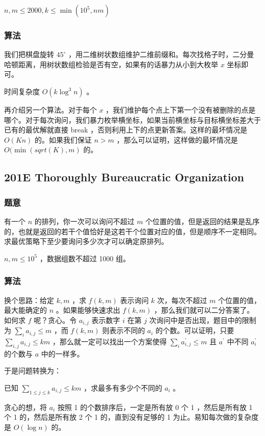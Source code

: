 \documentclass[11pt]{article}
\begin{document}
    $n, m \leq 2000, k \leq \min(10^5, nm)$
\subsubsection{算法}
\label{sec-11-5-2}

我们把棋盘旋转 $45^\circ$ ，用二维树状数组维护二维前缀和。每次找格子时，二分曼哈顿距离，用树状数组检验是否有空，如果有的话暴力从小到大枚举 $x$ 坐标即可。

时间复杂度 $O(k \log^3 n)$ 。

再介绍另一个算法。对于每个 $x$ ，我们维护每个点上下第一个没有被删除的点是哪个。对于每次询问，我们暴力枚举横坐标，如果当前横坐标与目标横坐标差大于已有的最优解就直接 break ，否则利用上下的点更新答案。这样的最坏情况是 $O(Kn)$ 的。如果我们保证 $n > m$ ，那么可以证明，这样做的最坏情况是 $O(\min(sqrt(K), m)$ 的。
\subsection{201E  Thoroughly Bureaucratic Organization}
\label{sec-11-6}
\subsubsection{题意}
\label{sec-11-6-1}

    有一个 $n$ 的排列，你一次可以询问不超过 $m$ 个位置的值，但是返回的结果是乱序的，也就是返回的若干个值恰好是这若干个位置对应的值，但是顺序不一定相同。求最优策略下至少要询问多少次才可以确定原排列。

    $n, m \leq 10^5$ ，数据组数不超过 1000 组。
\subsubsection{算法}
\label{sec-11-6-2}

    换个思路：给定 $k, m$ ，求 $f(k, m)$ 表示询问 $k$ 次，每次不超过 $m$ 个位置的值，最大能确定的 $n$ 。如果能够快速求出 $f(k, m)$ ，那么我们就可以二分答案了。如何求 $f$ 呢？贪心。令 $a_{i, j}$ 表示数字 $i$ 在第 $j$ 次询问中是否出现，题目中的限制为 $\sum_{i} a_{i, j} \leq m$ ，而 $f (k, m)$ 则表示不同的 $a_i$ 的个数。可以证明，只要 $\sum_{i, j} a_{i, j} \leq km$ ，那么就一定可以找出一个方案使得 $\sum_{i} a^\prime_{i, j} \leq m$ 且 $a^\prime$ 中不同 $a^\prime_i$ 的个数与 $a$ 中的一样多。

    于是问题转换为：
\begin{problem}
  已知 $\sum_{1 \leq j \leq k} a_{i, j} \leq km$ ，求最多有多少个不同的 $a_i$ 。
\end{problem}
    贪心的想，将 $a_i$ 按照 1 的个数排序后，一定是所有放 0 个 1 ，然后是所有放 1 个 1 的，然后是所有放 2 个 1 的，直到没有足够的 1 为止。易知每次做的复杂度是 $O(\log n)$ 的。
\end{document}

